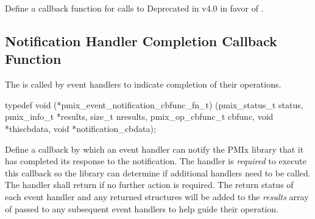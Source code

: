 \descr

Define a callback function for calls to  Deprecated in v4.0 in favor of .


\subsection{Notification Handler Completion Callback Function}

\summary

The  is called by event handlers to indicate completion of their operations.

\cspecificstart
\begin{codepar}
typedef void (*pmix_event_notification_cbfunc_fn_t)
    (pmix_status_t status,
     pmix_info_t *results, size_t nresults,
     pmix_op_cbfunc_t cbfunc, void *thiscbdata,
     void *notification_cbdata);
\end{codepar}
\cspecificend

\begin{arglist}
\end{arglist}

\descr

Define a callback by which an event handler can notify the \ac{PMIx} library that it has completed its response to the notification. The handler is \textit{required} to execute this callback so the library can determine if additional handlers need to be called. The handler shall return  if no further action is required. The return status of each event handler and any returned  structures will be added to the \textit{results} array of  passed to any subsequent event handlers to help guide their operation.

